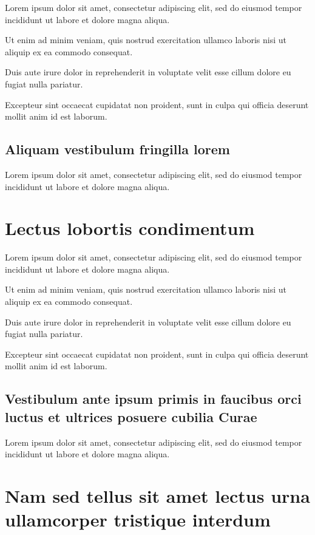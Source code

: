 \documentclass[]{fateczl-abntex2}
\begin{document}
Lorem ipsum dolor sit amet, consectetur adipiscing elit, sed do eiusmod tempor incididunt ut labore et dolore magna aliqua.

Ut enim ad minim veniam, quis nostrud exercitation ullamco laboris nisi ut aliquip ex ea commodo consequat.

Duis aute irure dolor in reprehenderit in voluptate velit esse cillum dolore eu fugiat nulla pariatur. 

Excepteur sint occaecat cupidatat non proident, sunt in culpa qui officia deserunt mollit anim id est laborum.

\section{Aliquam vestibulum fringilla lorem}

Lorem ipsum dolor sit amet, consectetur adipiscing elit, sed do eiusmod tempor incididunt ut labore et dolore magna aliqua.

\chapter{Lectus lobortis condimentum}

Lorem ipsum dolor sit amet, consectetur adipiscing elit, sed do eiusmod tempor incididunt ut labore et dolore magna aliqua.

Ut enim ad minim veniam, quis nostrud exercitation ullamco laboris nisi ut aliquip ex ea commodo consequat.

Duis aute irure dolor in reprehenderit in voluptate velit esse cillum dolore eu fugiat nulla pariatur. 

Excepteur sint occaecat cupidatat non proident, sunt in culpa qui officia deserunt mollit anim id est laborum.

\section{Vestibulum ante ipsum primis in faucibus orci luctus et ultrices
posuere cubilia Curae}

Lorem ipsum dolor sit amet, consectetur adipiscing elit, sed do eiusmod tempor incididunt ut labore et dolore magna aliqua.

\chapter{Nam sed tellus sit amet lectus urna ullamcorper tristique interdum}
\end{document}
